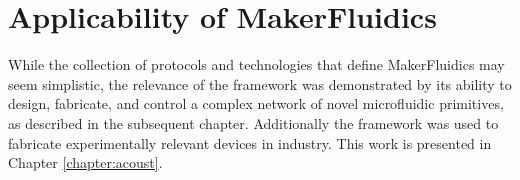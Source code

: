 \section{Applicability of MakerFluidics}
\label{sec:mfApplicability}
While the collection of protocols and technologies that define MakerFluidics may seem simplistic, the relevance of the framework was demonstrated by  its ability to design, fabricate, and control a complex network of novel microfluidic primitives, as described in the subsequent chapter. Additionally the framework was used to fabricate experimentally relevant devices in industry. This work is presented in Chapter \ref{chapter:acoust}.
